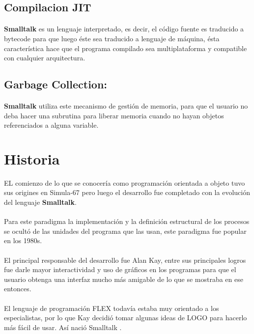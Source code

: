 \documentclass[11pt]{article}
\begin{document}
\subsection{\textbf{Compilacion JIT}}
\paragraph{} \noindent
\textbf{Smalltalk} es un lenguaje interpretado, es decir, el código fuente es traducido a bytecode para que luego éste sea traducido a lenguaje de máquina, ésta característica hace que el programa compilado sea multiplataforma y compatible con cualquier arquitectura.
\subsection{\textbf{Garbage Collection:}}
\paragraph{} \noindent
\textbf{Smalltalk} utiliza este mecanismo de gestión de memoria, para que el usuario no deba hacer una subrutina para liberar memoria cuando no hayan objetos referenciados a alguna variable.
\section{\textbf{Historia}}
\paragraph{} \noindent
EL comienzo de lo que se conocería como programación orientada a objeto tuvo sus origines en Simula-67 pero luego el desarrollo fue completado con la evolución del lenguaje \textbf{Smalltalk}.
\paragraph{} \noindent
Para este paradigma la implementación y la definición estructural de los procesos se ocultó de las unidades del programa que las usan, este paradigma fue popular en los 1980s.
\paragraph{} \noindent
El principal responsable del desarrollo fue Alan Kay, entre sus principales logros fue darle mayor interactividad y uso de gráficos en los programas para que el usuario obtenga una interfaz mucho más amigable de lo que se mostraba en ese entonces.
\paragraph{} \noindent
El lenguaje de programación FLEX todavía estaba muy orientado a los especialistas, por lo que Kay decidió tomar algunas ideas de LOGO para hacerlo más fácil de usar. Así nació Smalltalk \cite{cinvestav}.
\end{document}
